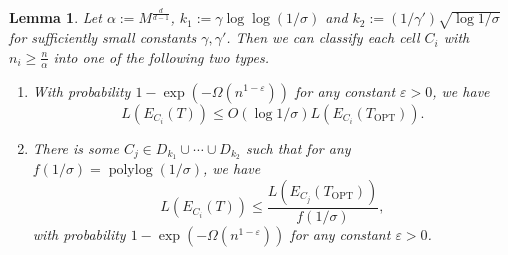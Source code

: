 \documentclass[11pt,DIV=12,a4paper]{scrartcl}
\newtheorem{lemma}[claim]{Lemma}
\DeclareMathOperator{\polylog}{polylog}
\newcommand{\OPT}{\mathrm{OPT}}
\begin{document}
\begin{lemma}\label{lem:heavyCells}
Let $\alpha := M^\frac{d}{d-1}$, $k_1 :=\gamma \log \log (1/\sigma)$ and $k_2 := (1/\gamma') \sqrt{\log 1/\sigma}$ for sufficiently small constants $\gamma,\gamma'$. Then we can classify each cell $C_i$ with $n_i \ge \frac{n}{\alpha}$ into one of the following two types.
\begin{enumerate}[label=(T\arabic{*})]
\item\label{itm:Tclose} With probability $1-\exp(-\Omega(n^{1-\varepsilon}))$ for any constant $\varepsilon>0$, we have 
\[L(E_{C_i}(T)) \le O(\log 1/\sigma) L(E_{C_i}(T_\OPT)).\]
\item\label{itm:Tfar} There is some $C_j\in D_{k_1} \cup \cdots \cup D_{k_2}$ such that for any $f(1/\sigma)=\polylog(1/\sigma)$, we have 
\[L(E_{C_i}(T)) \le \frac{L(E_{C_j}(T_\OPT))}{f(1/\sigma)},\]
with probability $1-\exp(-\Omega(n^{1-\varepsilon}))$ for any constant $\varepsilon>0$.
\end{enumerate}
\end{lemma}
\end{document}

